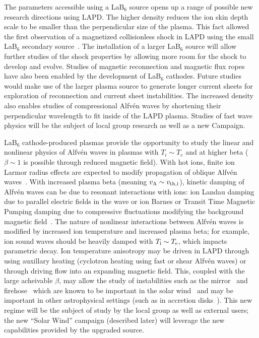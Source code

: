 \documentclass[11pt]{article}
\renewcommand{\cite}{\citep}
\begin{document}
The parameters accessible using a LaB$_6$ source opens up a range of
possible new research directions using LAPD.  The higher density
reduces the ion skin depth scale to be smaller than the perpendicular
size of the plasma.  This fact allowed the first observation of a
magnetized collisionless shock in LAPD using the small LaB$_6$
secondary source~\cite{schaeffer:2014,niemann:2014}.  The installation of a larger LaB$_6$ source
will allow further studies of the shock properties by allowing more room
for the shock to develop and evolve.  Studies of magnetic
reconnection and magnetic flux ropes have also been enabled by the
development of LaB$_6$ cathodes.  Future studies would make use of the larger
plasma source to generate longer current sheets for exploration of
reconnection and current sheet instabilities.  The increased
density also enables studies of compressional Alfv\'{e}n waves by
shortening their perpendicular wavelength to fit inside of the LAPD plasma.
Studies of fast wave physics will be the subject of local group
research as well as a new Campaign.  

LaB$_6$ cathode-produced plasmas provide the opportunity to study the
linear and nonlinear physics of Alfv\'{e}n waves in plasmas with $T_i
\sim T_e$ and at higher beta ($\beta \sim 1$ is possible through
reduced magnetic field).  With hot ions, finite ion Larmor radius
effects are expected to modify propagation of oblique Alfv\'{e}n
waves~\cite{hasegawa76,lysak96}.  With increased plasma beta (meaning
$v_{\rm A} \sim v_{\rm th,i}$), kinetic damping of Alfv\'{e}n waves
can be due to resonant interactions with ions: ion Landau damping due
to parallel electric fields in the wave or ion Barnes or Transit Time
Magnetic Pumping damping due to compressive fluctuations modifying the
background magnetic field~\cite{barnes66}.  The nature of nonlinear
interactions between Alfv\'{e}n waves is modified by increased ion
temperature and increased plasma beta; for example, ion sound waves
should be heavily damped with $T_{\rm i} \sim T_{\rm e}$, which
impacts parametric decay.  Ion temperature anisotropy may be driven
in LAPD through using auxillary heating (cyclotron heating using fast
or shear Alfv\'{e}n waves) or through driving flow into an expanding
magnetic field.  This, coupled with the
large acheivable $\beta$, may allow the study of 
instabilities such as the mirror~\cite{gary92} and firehose~\cite{gary98} which are known to be
important in the solar wind~\cite{hellinger06,bale09} and may be important in other
astrophysical settings (such as in accretion disks~\cite{schekochihin08}).   This
new regime will be the subject of study by the local group as well as
external users; the new ``Solar Wind'' campaign (described later) will
leverage the new capabilities provided by the upgraded source.
\end{document}
